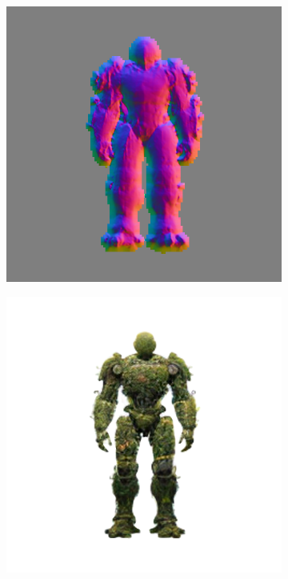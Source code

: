 \begin{figure}[ht]
\begin{subfigure}[b]{0.18\textwidth}
        \includegraphics[width=\textwidth]{etc/a robot made out of plants/wonder3d/test/wonder3D_9000_front_part4}
        \caption{}
    \end{subfigure}
    \begin{subfigure}[b]{0.18\textwidth}
        \centering
        \fontsize{9pt}{7pt}\selectfont{}
        \includegraphics[width=\textwidth]{etc/a robot made out of plants/wonder3d/test/wonder3D_10000_front_part1}

\end{subfigure}
\end{figure}
